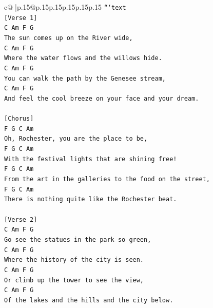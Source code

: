 \documentclass{article}
\begin{document}
{\begin{supertabular}{c@{$\;$}|p{.15\linewidth}@{}p{.15\linewidth}p{.15\linewidth}p{.15\linewidth}p{.15\linewidth}p{.15\linewidth}}
{{{\texttt{```text} \\
\texttt{{[}Verse 1{]}} \\
\texttt{C          Am          F          G} \\
\texttt{The sun comes up on the River wide,} \\
\texttt{C          Am          F          G} \\
\texttt{Where the water flows and the willows hide.} \\
\texttt{C          Am          F          G} \\
\texttt{You can walk the path by the Genesee stream,} \\
\texttt{C          Am          F          G} \\
\texttt{And feel the cool breeze on your face and your dream.} \\
\\ 
\texttt{{[}Chorus{]}} \\
\texttt{F          G          C          Am} \\
\texttt{Oh, Rochester, you are the place to be,} \\
\texttt{F          G          C          Am} \\
\texttt{With the festival lights that are shining free!} \\
\texttt{F          G          C          Am} \\
\texttt{From the art in the galleries to the food on the street,} \\
\texttt{F          G          C          Am} \\
\texttt{There is nothing quite like the Rochester beat.} \\
\\ 
\texttt{{[}Verse 2{]}} \\
\texttt{C          Am          F          G} \\
\texttt{Go see the statues in the park so green,} \\
\texttt{C          Am          F          G} \\
\texttt{Where the history of the city is seen.} \\
\texttt{C          Am          F          G} \\
\texttt{Or climb up the tower to see the view,} \\
\texttt{C          Am          F          G} \\
\texttt{Of the lakes and the hills and the city below.} \\
\\ 
}}}
\end{supertabular}}
\end{document}
